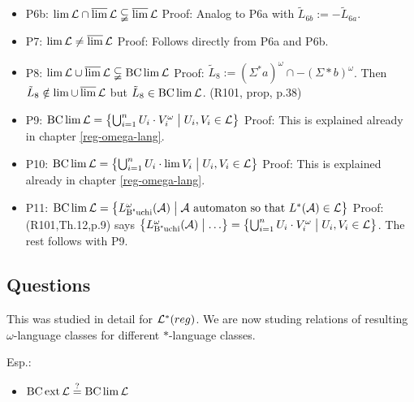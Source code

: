 \begin{itemize}
\item P6b: $\lim \mathcal{L} \cap \operatorname{\overline{lim}} \mathcal{L} \subsetneqq \operatorname{\overline{lim}} \mathcal{L}$ \newline
Proof: Analog to P6a with $\tilde{L}_{6b} := -\tilde{L}_{6a}$.
\item P7: $\lim \mathcal{L} \neq \operatorname{\overline{lim}} \mathcal{L}$ \newline
Proof: Follows directly from P6a and P6b.
\item P8: $\lim \mathcal{L} \cup \operatorname{\overline{lim}} \mathcal{L} \subsetneqq \operatorname{BC} \lim \mathcal{L}$ \newline
Proof: $\tilde{L}_8 := (\Sigma^*a)^\omega \cap -(\Sigma*b)^\omega$. Then $\tilde{L}_8 \notin \lim \cup \operatorname{\overline{lim}} \mathcal{L}$ but $\tilde{L}_8 \in \operatorname{BC} \lim \mathcal{L}$. (R101, prop, p.38)
\item P9: $\BC \lim \Lang = \Set{ \bigcup_{i=1}^n U_i \cdot V_i^\omega}{U_i, V_i \in \Lang}$ \newline
Proof: This is explained already in chapter \ref{reg-omega-lang}. 
\item P10: $\BC \lim \Lang = \Set{\bigcup_{i=1}^n U_i \cdot \lim V_i}{U_i, V_i \in \Lang}$ \newline
Proof: This is explained already in chapter \ref{reg-omega-lang}. 
\item P11: $\BC \lim \Lang = \Set{L_{\text{B"uchi}}^\omega(\A)}{\A \text{ automaton so that } L^*(\A) \in \Lang}$ \newline
Proof: (R101,Th.12,p.9) says $\Set{L_{\text{B"uchi}}^\omega(\A)}{\dots} = \Set{ \bigcup_{i=1}^n U_i \cdot V_i^\omega}{U_i, V_i \in \Lang}$. The rest follows with P9.
\end{itemize}

\subsection{Questions}

This was studied in detail for $\mathcal{L}^*(reg)$. We are now studing relations of resulting $\omega$-language classes for different $*$-language classes.

Esp.:
\begin{itemize}
\item $\operatorname{BC} \operatorname{ext} \mathcal{L} \overset{?}{=} \operatorname{BC} \lim \mathcal{L}$
\end{itemize}


